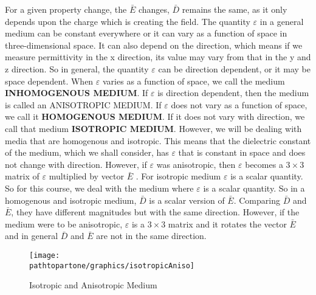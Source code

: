 For a given property change, the $\bar{E}$ changes, $\bar{D}$ remains the same, as it only depends upon the charge which is creating the field. The quantity $\varepsilon$ in a general medium can be constant everywhere or it can vary as a function of space in three-dimensional space. It can also depend on the direction, which means if we measure permittivity in the x direction, its value may vary from that in the y and z direction. So in general, the quantity  $\varepsilon$  can be direction dependent, or it may be space dependent. When  $\varepsilon$  varies as a function of space, we call the medium \textbf{INHOMOGENOUS MEDIUM}. If  $\varepsilon$  is direction dependent, then the medium is called an ANISOTROPIC MEDIUM. If  $\varepsilon$ does not vary as a function of space, we call it \textbf{HOMOGENOUS MEDIUM}. If it does not vary with direction, we call that medium \textbf{ISOTROPIC MEDIUM}.
However, we will be dealing with media that are homogenous and isotropic. This means that the dielectric constant of the medium, which we shall consider, has  $\varepsilon$ that is constant in space and does not change with direction. However, if  $\varepsilon$  was anisotropic, then  $\varepsilon$  becomes a $3\times 3$ matrix of  $\varepsilon$  multiplied by vector $\bar{E}$ . For isotropic medium  $\varepsilon$  is a scalar quantity. So for this course, we deal with the medium where  $\varepsilon$  is a scalar quantity.
So in a homogenous and isotropic medium,  $\bar{D}$ is a scalar version of  $\bar{E}$. Comparing  $\bar{D}$ and  $\bar{E}$, they have different magnitudes but with the same direction. However, if the medium were to be anisotropic,  $\varepsilon$ is a $3\times 3$ matrix and it rotates the vector  $\bar{E}$ and in general  $\bar{D}$ and  $\bar{E}$ are not in the same direction.

\begin{figure}
\centering
\texttt{[image: \\pathtopartone/graphics/isotropicAniso]}
\caption{Isotropic and Anisotropic Medium}
\end{figure}

